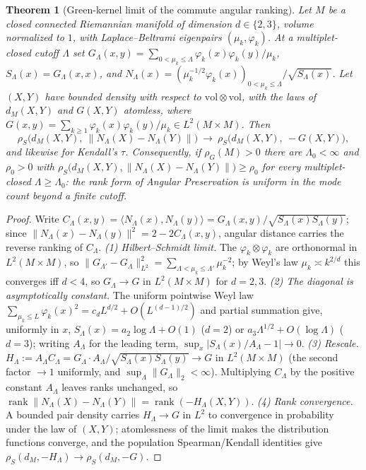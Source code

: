 \documentclass[11pt]{article}
\newtheorem{theorem}{Theorem}
\theoremstyle{remark}
\begin{document}
\begin{theorem}[Green-kernel limit of the commute angular ranking]\label{thm:green-rank-limit}
Let $M$ be a closed connected Riemannian manifold of dimension $d\in\{2,3\}$, volume
normalized to $1$, with Laplace--Beltrami eigenpairs $(\mu_k,\varphi_k)$. At a
multiplet-closed cutoff $\Lambda$ set
$G_\Lambda(x,y)=\sum_{0<\mu_k\le\Lambda}\varphi_k(x)\varphi_k(y)/\mu_k$,
$S_\Lambda(x)=G_\Lambda(x,x)$, and
$N_\Lambda(x)=(\mu_k^{-1/2}\varphi_k(x))_{0<\mu_k\le\Lambda}/\sqrt{S_\Lambda(x)}$. Let
$(X,Y)$ have bounded density with respect to $\mathrm{vol}\otimes\mathrm{vol}$, with
the laws of $d_M(X,Y)$ and $G(X,Y)$ atomless, where
$G(x,y)=\sum_{k\ge1}\varphi_k(x)\varphi_k(y)/\mu_k\in L^2(M\times M)$. Then
\[
\rho_S\bigl(d_M(X,Y),\ \lVert N_\Lambda(X)-N_\Lambda(Y)\rVert\bigr)\ \longrightarrow\
\rho_S\bigl(d_M(X,Y),\ -G(X,Y)\bigr),
\]
and likewise for Kendall's $\tau$. Consequently, if $\rho_G(M)>0$ there are
$\Lambda_0<\infty$ and $\rho_0>0$ with
$\rho_S\bigl(d_M(X,Y),\lVert N_\Lambda(X)-N_\Lambda(Y)\rVert\bigr)\ge\rho_0$ for every
multiplet-closed $\Lambda\ge\Lambda_0$: the rank form of Angular Preservation is uniform
in the mode count beyond a finite cutoff.
\end{theorem}

\begin{proof}
Write $C_\Lambda(x,y)=\langle N_\Lambda(x),N_\Lambda(y)\rangle=
G_\Lambda(x,y)/\sqrt{S_\Lambda(x)S_\Lambda(y)}$; since
$\lVert N_\Lambda(x)-N_\Lambda(y)\rVert^2=2-2C_\Lambda(x,y)$, angular distance carries the
reverse ranking of $C_\Lambda$.
\emph{(1) Hilbert--Schmidt limit.} The $\varphi_k\otimes\varphi_k$ are orthonormal in
$L^2(M\times M)$, so $\lVert G_{\Lambda'}-G_\Lambda\rVert^2_{L^2}=
\sum_{\Lambda<\mu_k\le\Lambda'}\mu_k^{-2}$; by Weyl's law $\mu_k\asymp k^{2/d}$ this
converges iff $d<4$, so $G_\Lambda\to G$ in $L^2(M\times M)$ for $d=2,3$.
\emph{(2) The diagonal is asymptotically constant.} The uniform pointwise Weyl law
$\sum_{\mu_k\le L}\varphi_k(x)^2=c_dL^{d/2}+O(L^{(d-1)/2})$ and partial summation give,
uniformly in $x$, $S_\Lambda(x)=a_2\log\Lambda+O(1)$ ($d=2$) or
$a_3\Lambda^{1/2}+O(\log\Lambda)$ ($d=3$); writing $A_\Lambda$ for the leading term,
$\sup_x\lvert S_\Lambda(x)/A_\Lambda-1\rvert\to0$.
\emph{(3) Rescale.} $H_\Lambda:=A_\Lambda C_\Lambda=
G_\Lambda\cdot A_\Lambda/\sqrt{S_\Lambda(x)S_\Lambda(y)}\to G$ in $L^2(M\times M)$ (the
second factor $\to1$ uniformly, and $\sup_\Lambda\lVert G_\Lambda\rVert_2<\infty$).
Multiplying $C_\Lambda$ by the positive constant $A_\Lambda$ leaves ranks unchanged, so
$\operatorname{rank}\lVert N_\Lambda(X)-N_\Lambda(Y)\rVert=\operatorname{rank}(-H_\Lambda(X,Y))$.
\emph{(4) Rank convergence.} A bounded pair density carries $H_\Lambda\to G$ in $L^2$ to
convergence in probability under the law of $(X,Y)$; atomlessness of the limit makes the
distribution functions converge, and the population Spearman/Kendall identities give
$\rho_S(d_M,-H_\Lambda)\to\rho_S(d_M,-G)$.
\end{proof}
\end{document}
